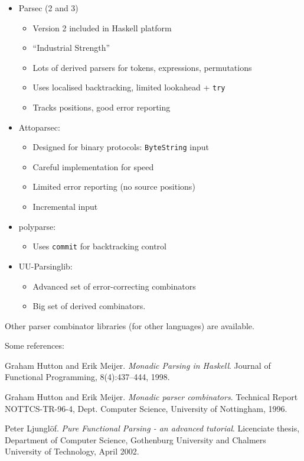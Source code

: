 \documentclass{beamer}
\begin{document}
\begin{frame}
  \begin{itemize}
  \item Parsec (2 and 3)
    \begin{itemize}
    \item Version 2 included in Haskell platform
    \item ``Industrial Strength''
    \item Lots of derived parsers for tokens, expressions, permutations
    \item Uses localised backtracking, limited lookahead + \texttt{try}
    \item Tracks positions, good error reporting
    \end{itemize}
  \item Attoparsec:
    \begin{itemize}
    \item Designed for binary protocols: \texttt{ByteString} input
    \item Careful implementation for speed
    \item Limited error reporting (no source positions)
    \item Incremental input
    \end{itemize}
  \item polyparse:
    \begin{itemize}
    \item Uses \texttt{commit} for backtracking control
    \end{itemize}
  \item UU-Parsinglib:
    \begin{itemize}
    \item Advanced set of error-correcting combinators
    \item Big set of derived combinators.
    \end{itemize}
  \end{itemize}

  \bigskip

  \tiny{Other parser combinator libraries (for other languages) are available.}
\end{frame}

\begin{frame}
  Some references:

  \bigskip

  Graham Hutton and Erik Meijer. \emph{Monadic Parsing in
    Haskell}. Journal of Functional Programming, 8(4):437--444, 1998.

  \bigskip

  Graham Hutton and Erik Meijer. \emph{Monadic parser
    combinators}. Technical Report NOTTCS-TR-96-4, Dept. Computer
  Science, University of Nottingham, 1996.

  \bigskip

  Peter Ljungl\"of. \emph{Pure Functional Parsing - an advanced
    tutorial}. Licenciate thesis, Department of Computer Science,
  Gothenburg University and Chalmers University of Technology, April
  2002.
\end{frame}
\end{document}
